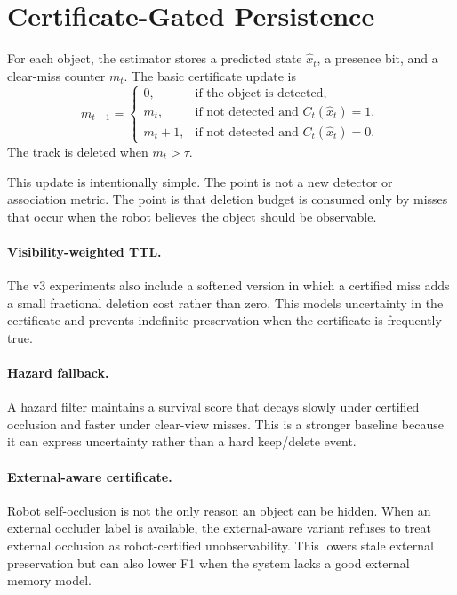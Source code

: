 \documentclass{article}
\begin{document}
\section{Certificate-Gated Persistence}

For each object, the estimator stores a predicted state $\hat x_t$, a presence
bit, and a clear-miss counter $m_t$. The basic certificate update is
\begin{equation}
m_{t+1} =
\begin{cases}
0, & \text{if the object is detected},\\
m_t, & \text{if not detected and } C_t(\hat x_t)=1,\\
m_t+1, & \text{if not detected and } C_t(\hat x_t)=0.
\end{cases}
\end{equation}
The track is deleted when $m_t>\tau$.

This update is intentionally simple. The point is not a new detector or
association metric. The point is that deletion budget is consumed only by
misses that occur when the robot believes the object should be observable.

\paragraph{Visibility-weighted TTL.}
The v3 experiments also include a softened version in which a certified miss
adds a small fractional deletion cost rather than zero. This models uncertainty
in the certificate and prevents indefinite preservation when the certificate is
frequently true.

\paragraph{Hazard fallback.}
A hazard filter maintains a survival score that decays slowly under certified
occlusion and faster under clear-view misses. This is a stronger baseline
because it can express uncertainty rather than a hard keep/delete event.

\paragraph{External-aware certificate.}
Robot self-occlusion is not the only reason an object can be hidden. When an
external occluder label is available, the external-aware variant refuses to
treat external occlusion as robot-certified unobservability. This lowers stale
external preservation but can also lower F1 when the system lacks a good
external memory model.
\end{document}
